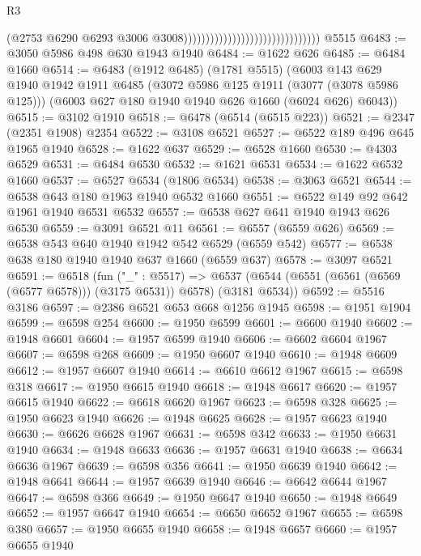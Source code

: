 \begin{lexlean}{R3}
\begin{coremodule}
                                                                (@2753
                                                                  @6290
                                                                  @6293
                                                                  @3006
                                                                  @3008)))))))))))))))))))))))))))))))
    @5515
@6483 := @3050 @5986 @498 @630 @1943 @1940
@6484 := @1622 @626
@6485 := @6484 @1660
@6514 := @6483
    (@1912 @6485)
    (@1781 @5515)
    (@6003
      @143
      @629
      @1940
      @1942
      @1911
      @6485
      (@3072 @5986 @125 @1911 (@3077 (@3078 @5986 @125)))
      (@6003 @627 @180 @1940 @1940 @626 @1660 (@6024 @626) @6043))
@6515 := @3102 @1910
@6518 := @6478 (@6514 (@6515 @223))
@6521 := @2347 (@2351 @1908) @2354
@6522 := @3108 @6521
@6527 := @6522 @189 @496 @645 @1965 @1940
@6528 := @1622 @637
@6529 := @6528 @1660
@6530 := @4303 @6529
@6531 := @6484 @6530
@6532 := @1621 @6531
@6534 := @1622 @6532 @1660
@6537 := @6527 @6534 (@1806 @6534)
@6538 := @3063 @6521
@6544 := @6538 @643 @180 @1963 @1940 @6532 @1660
@6551 := @6522 @149 @92 @642 @1961 @1940 @6531 @6532
@6557 := @6538 @627 @641 @1940 @1943 @626 @6530
@6559 := @3091 @6521 @11
@6561 := @6557 (@6559 @626)
@6569 := @6538 @543 @640 @1940 @1942 @542 @6529 (@6559 @542)
@6577 := @6538 @638 @180 @1940 @1940 @637 @1660 (@6559 @637)
@6578 := @3097 @6521
@6591 := @6518
    (fun ("_" : @5517) =>
    @6537 (@6544 (@6551 (@6561 (@6569 (@6577 @6578))) (@3175 @6531)) @6578) (@3181 @6534))
@6592 := @5516 @3186
@6597 := @2386 @6521 @653 @668 @1256 @1945
@6598 := @1951 @1904
@6599 := @6598 @254
@6600 := @1950 @6599
@6601 := @6600 @1940
@6602 := @1948 @6601
@6604 := @1957 @6599 @1940
@6606 := @6602 @6604 @1967
@6607 := @6598 @268
@6609 := @1950 @6607 @1940
@6610 := @1948 @6609
@6612 := @1957 @6607 @1940
@6614 := @6610 @6612 @1967
@6615 := @6598 @318
@6617 := @1950 @6615 @1940
@6618 := @1948 @6617
@6620 := @1957 @6615 @1940
@6622 := @6618 @6620 @1967
@6623 := @6598 @328
@6625 := @1950 @6623 @1940
@6626 := @1948 @6625
@6628 := @1957 @6623 @1940
@6630 := @6626 @6628 @1967
@6631 := @6598 @342
@6633 := @1950 @6631 @1940
@6634 := @1948 @6633
@6636 := @1957 @6631 @1940
@6638 := @6634 @6636 @1967
@6639 := @6598 @356
@6641 := @1950 @6639 @1940
@6642 := @1948 @6641
@6644 := @1957 @6639 @1940
@6646 := @6642 @6644 @1967
@6647 := @6598 @366
@6649 := @1950 @6647 @1940
@6650 := @1948 @6649
@6652 := @1957 @6647 @1940
@6654 := @6650 @6652 @1967
@6655 := @6598 @380
@6657 := @1950 @6655 @1940
@6658 := @1948 @6657
@6660 := @1957 @6655 @1940

\end{coremodule}
\end{lexlean}
